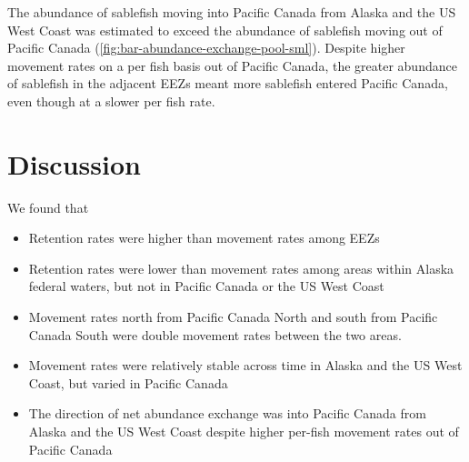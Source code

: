 \documentclass{article}
\begin{document}
The abundance of sablefish moving into Pacific Canada from Alaska and the US West Coast was estimated to exceed the abundance of sablefish moving out of Pacific Canada (\autoref{fig:bar-abundance-exchange-pool-sml}). Despite higher movement rates on a per fish basis out of Pacific Canada, the greater abundance of sablefish in the adjacent EEZs meant more sablefish entered Pacific Canada, even though at a slower per fish rate.


\section{Discussion}

\noindent We found that 
\begin{itemize}
\item Retention rates were higher than movement rates among EEZs
\item Retention rates were lower than movement rates among areas within Alaska federal waters, but not in Pacific Canada or the US West Coast
\item Movement rates north from Pacific Canada North and south from Pacific Canada South were double movement rates between the two areas.
\item Movement rates were relatively stable across time in Alaska and the US West Coast, but varied in Pacific Canada
\item The direction of net abundance exchange was into Pacific Canada from Alaska and the US West Coast despite higher per-fish movement rates out of Pacific Canada
\end{itemize}
\end{document}
